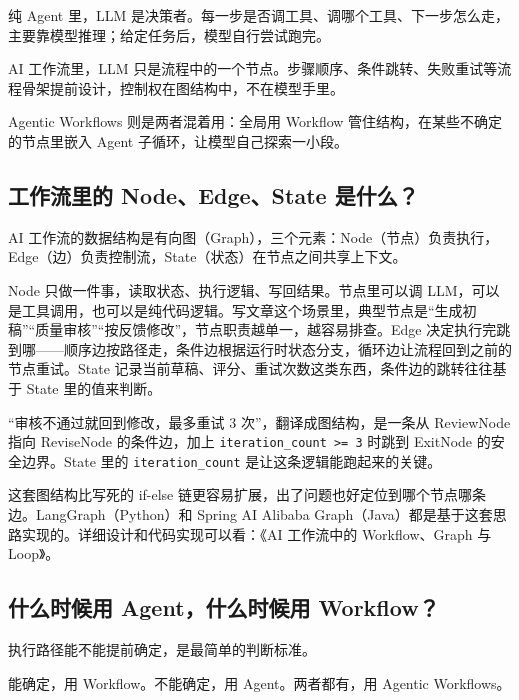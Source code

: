 \documentclass[9pt,a4paper,twocolumn]{ctexart}
\begin{document}
纯 Agent 里，LLM 是决策者。每一步是否调工具、调哪个工具、下一步怎么走，主要靠模型推理；给定任务后，模型自行尝试跑完。



AI 工作流里，LLM 只是流程中的一个节点。步骤顺序、条件跳转、失败重试等流程骨架提前设计，控制权在图结构中，不在模型手里。



Agentic Workflows 则是两者混着用：全局用 Workflow 管住结构，在某些不确定的节点里嵌入 Agent 子循环，让模型自己探索一小段。



\subsection*{工作流里的 Node、Edge、State 是什么？}


AI 工作流的数据结构是有向图（Graph），三个元素：Node（节点）负责执行，Edge（边）负责控制流，State（状态）在节点之间共享上下文。



Node 只做一件事，读取状态、执行逻辑、写回结果。节点里可以调 LLM，可以是工具调用，也可以是纯代码逻辑。写文章这个场景里，典型节点是“生成初稿”“质量审核”“按反馈修改”，节点职责越单一，越容易排查。Edge 决定执行完跳到哪——顺序边按路径走，条件边根据运行时状态分支，循环边让流程回到之前的节点重试。State 记录当前草稿、评分、重试次数这类东西，条件边的跳转往往基于 State 里的值来判断。



“审核不通过就回到修改，最多重试 3 次”，翻译成图结构，是一条从 ReviewNode 指向 ReviseNode 的条件边，加上 \texttt{iteration\_count >= 3} 时跳到 ExitNode 的安全边界。State 里的 \texttt{iteration\_count} 是让这条逻辑能跑起来的关键。



这套图结构比写死的 if-else 链更容易扩展，出了问题也好定位到哪个节点哪条边。LangGraph（Python）和 Spring AI Alibaba Graph（Java）都是基于这套思路实现的。详细设计和代码实现可以看：《AI 工作流中的 Workflow、Graph 与 Loop》。



\subsection*{什么时候用 Agent，什么时候用 Workflow？}


执行路径能不能提前确定，是最简单的判断标准。



能确定，用 Workflow。不能确定，用 Agent。两者都有，用 Agentic Workflows。
\end{document}
